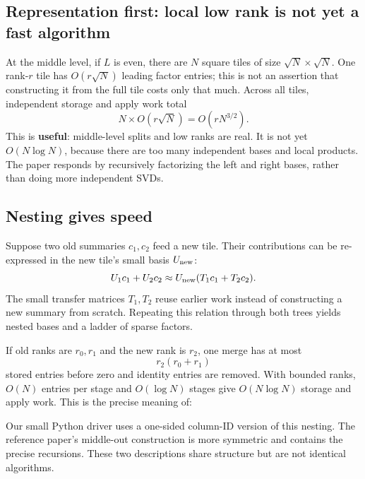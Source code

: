 \subsection{Representation first: local low rank is not yet a fast algorithm}
At the middle level, if $L$ is even, there are $N$ square tiles of size $\sqrt N\times\sqrt N$. One rank-$r$ tile has $O(r\sqrt N)$ leading factor entries; this is not an assertion that constructing it from the full tile costs only that much. Across all tiles, independent storage and apply work total
\begin{equation}
 N\times O(r\sqrt N)=O(rN^{3/2}).
 \label{eq:middlecost}
\end{equation}
This is \textbf{useful}: middle-level splits and low ranks are real. It is not yet $O(N\log N)$, because there are too many independent bases and local products. The paper responds by recursively factorizing the left and right bases, rather than doing more independent SVDs.

\subsection{Nesting gives speed}
Suppose two old summaries $c_1,c_2$ feed a new tile. Their contributions can be re-expressed in the new tile's small basis $U_{\rm new}$:
\begin{equation}
 U_1c_1+U_2c_2\approx U_{\rm new}(T_1c_1+T_2c_2).
 \label{eq:transfer}
\end{equation}
The small transfer matrices $T_1,T_2$ reuse earlier work instead of constructing a new summary from scratch. Repeating this relation through both trees yields nested bases and a ladder of sparse factors.

If old ranks are $r_0,r_1$ and the new rank is $r_2$, one merge has at most
\begin{equation}
 r_2(r_0+r_1)
 \label{eq:transfercost}
\end{equation}
stored entries before zero and identity entries are removed. With bounded ranks, $O(N)$ entries per stage and $O(\log N)$ stages give $O(N\log N)$ storage and apply work. This is the precise meaning of:

Our small Python driver uses a one-sided column-ID version of this nesting. The reference paper's middle-out construction is more symmetric and contains the precise recursions. These two descriptions share structure but are not identical algorithms.

